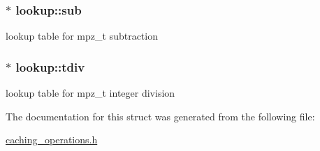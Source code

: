 \subsubsection[{\texorpdfstring{sub}{sub}}]{$\ast$ lookup\+::sub}\hypertarget{structlookup_a6847e05562a081e06e25d33ac8a205a2}{}\label{structlookup_a6847e05562a081e06e25d33ac8a205a2}
lookup table for mpz\+\_\+t subtraction 
\subsubsection[{\texorpdfstring{tdiv}{tdiv}}]{$\ast$ lookup\+::tdiv}\hypertarget{structlookup_abef492b10c81737d02dae892da38719a}{}\label{structlookup_abef492b10c81737d02dae892da38719a}
lookup table for mpz\+\_\+t integer division 

The documentation for this struct was generated from the following file\+:\begin{DoxyCompactItemize}
\item 
\hyperlink{caching__operations_8h}{caching\+\_\+operations.\+h}\end{DoxyCompactItemize}
